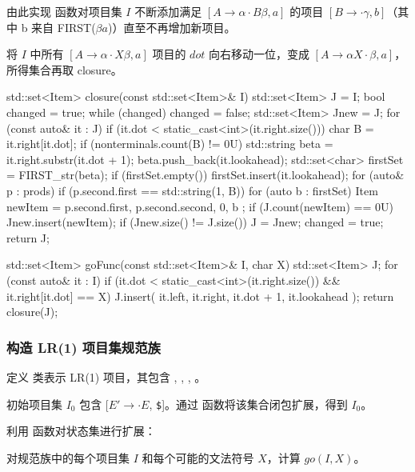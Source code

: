 由此实现  函数对项目集 $I$ 不断添加满足 $[A \to \alpha \cdot B \beta, a]$ 的项目 $[B \to \cdot \gamma, b]$（其中 b 来自 FIRST($\beta a$)）直至不再增加新项目。

 将 $I$ 中所有 $[A \to \alpha \cdot X\beta, a]$ 项目的 $dot$ 向右移动一位，变成 $[A \to \alpha X \cdot \beta, a]$，所得集合再取 closure。
\begin{cppcode}
std::set<Item> closure(const std::set<Item>& I)
{
    std::set<Item> J = I;
    bool changed = true;
    while (changed) {
        changed = false;
        std::set<Item> Jnew = J;
        for (const auto& it : J) {
            if (it.dot < static_cast<int>(it.right.size())) {
                char B = it.right[it.dot];
                if (nonterminals.count(B) != 0U) {
                    std::string beta = it.right.substr(it.dot + 1);
                    beta.push_back(it.lookahead);
                    std::set<char> firstSet = FIRST_str(beta);
                    if (firstSet.empty()) {
                        firstSet.insert(it.lookahead);
}
                    for (auto& p : prods) {
                        if (p.second.first == std::string(1, B)) {
                            for (auto b : firstSet) {
                                Item newItem = { p.second.first, p.second.second, 0, b };
                                if (J.count(newItem) == 0U) {
                                    Jnew.insert(newItem);
                                }
                            }
                        }
                    }
                }
            }
        }
        if (Jnew.size() != J.size()) {
            J = Jnew;
            changed = true;
        }
    }
    return J;
}

std::set<Item> goFunc(const std::set<Item>& I, char X)
{
    std::set<Item> J;
    for (const auto& it : I) {
        if (it.dot < static_cast<int>(it.right.size()) && it.right[it.dot] == X) {
            J.insert({ it.left, it.right, it.dot + 1, it.lookahead });
        }
    }
    return closure(J);
}
\end{cppcode}

\subsubsection{构造 LR(1) 项目集规范族}
\begin{compactitem}
    \item 定义  类表示 LR(1) 项目，其包含 , , , 。
	\item 初始项目集 $I_0$ 包含 [$E' \to \cdot E$, \verb|$|]。通过  函数将该集合闭包扩展，得到 $I_0$。
	\item 利用  函数对状态集进行扩展：
\end{compactitem}
对规范族中的每个项目集 $I$ 和每个可能的文法符号 $X$，计算 $go(I, X)$。

